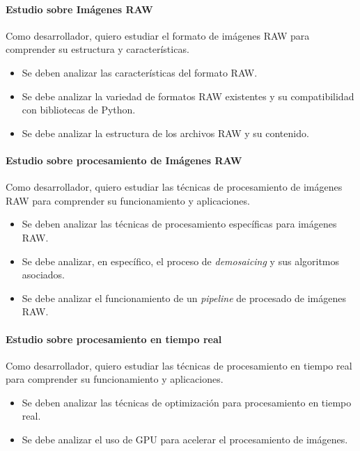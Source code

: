\paragraph{Estudio sobre Imágenes RAW} \label{hist:estudio_imagenes_raw}
Como desarrollador, quiero estudiar el formato de imágenes RAW para comprender su estructura y características.

\begin{itemize}[noitemsep]
	\item Se deben analizar las características del formato RAW.
	\item Se debe analizar la variedad de formatos RAW existentes y su compatibilidad con bibliotecas de Python.
	\item Se debe analizar la estructura de los archivos RAW y su contenido.
\end{itemize}

\paragraph{Estudio sobre procesamiento de Imágenes RAW} \label{hist:estudio_procesamiento_imagenes_raw}
Como desarrollador, quiero estudiar las técnicas de procesamiento de imágenes RAW para comprender su funcionamiento y aplicaciones.

\begin{itemize}[noitemsep]
	\item Se deben analizar las técnicas de procesamiento específicas para imágenes RAW.
	\item Se debe analizar, en específico, el proceso de \textit{demosaicing} y sus algoritmos asociados.
	\item Se debe analizar el funcionamiento de un \textit{pipeline} de procesado de imágenes RAW.
\end{itemize}

\paragraph{Estudio sobre procesamiento en tiempo real} \label{hist:estudio_procesamiento_tiempo_real}
Como desarrollador, quiero estudiar las técnicas de procesamiento en tiempo real para comprender su funcionamiento y aplicaciones.
\begin{itemize}[noitemsep]
	\item Se deben analizar las técnicas de optimización para procesamiento en tiempo real.
	\item Se debe analizar el uso de GPU para acelerar el procesamiento de imágenes.
\end{itemize}

